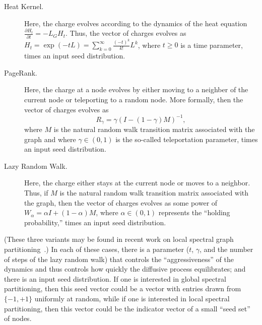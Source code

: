 \documentclass[12pt]{article}
\theoremstyle{plain}
\begin{document}
\begin{description}
  \item[Heat Kernel.]
    Here, the charge evolves according to the dynamics of the heat equation
    $\frac{\partial H_t}{\partial t} = - L_G H_t$.
    Thus, the vector of charges evolves as
$     H_t = \exp ( -tL )  = \sum_{k=0}^{\infty} \frac{(-t)^k}{k!}L^k  $,
    where $t \ge 0$ is a time parameter, times an input seed distribution.
  \item[PageRank.]
    Here, the charge at a node evolves by either moving to a neighber of 
    the current node or teleporting to a random node.
    More formally, then the vector of charges evolves as 
    \begin{equation}
    \label{eqn:page-rank}
    R_{\gamma} = \gamma \left(I-\left(1-\gamma \right)M \right)^{-1}   ,
    \end{equation}
    where $M$ is the natural random walk transition matrix associated 
    with the graph and
    where $\gamma \in (0,1)$ is the so-called teleportation parameter,
    times an input seed distribution.
  \item[Lazy Random Walk.]
    Here, the charge either stays at the current node or moves to a neighbor.
    Thus, if $M$ is the natural random walk transition matrix associated 
    with the graph, then the vector of charges evolves as some power of 
$     W_{\alpha}= \alpha I + (1-\alpha)M $,
    where $\alpha \in (0,1)$ represents the ``holding probability,'' times 
    an input seed distribution.
\end{description}
(These three variants may be found in recent work on local spectral graph 
partitioning~\cite{Spielman:2004,andersen06local,Chung07_heatkernelPNAS}.)
In each of these cases, there is a parameter ($t$, $\gamma$, and the number 
of steps of the lazy random walk) that controls the ``aggressiveness'' of 
the dynamics and thus controls how quickly the diffusive process 
equilibrates; and there is an input seed distribution.
If one is interested in global spectral partitioning, then this seed vector 
could be a vector with entries drawn from $\{-1,+1\}$ uniformly at random, 
while if one is interested in local spectral partitioning, then this vector 
could be the indicator vector of a small ``seed set'' of nodes.
\end{document}
